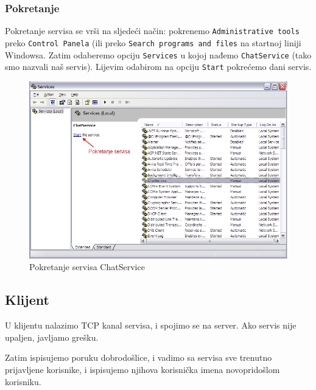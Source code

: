 \documentclass[10pt,a4paper,onecolumn,titlepage]{article}
\begin{document}
\subsubsection{Pokretanje}
Pokretanje servisa se vrši na sljedeći način: pokrenemo \texttt{Administrative tools}
preko \texttt{Control Panela} (ili preko \texttt{Search programs and files} na startnoj liniji Windowsa. Zatim odaberemo opciju \texttt{Services} u kojoj nađemo \texttt{ChatService}
(tako smo nazvali naš servis). Lijevim odabirom na opciju \texttt{Start} pokrećemo
dani servis.
\begin{figure}[!ht]
\begin{minipage}{\textwidth}
\centering
\includegraphics[width=\textwidth]{images/start_service.jpg}
\caption{Pokretanje servisa ChatService}
\end{minipage}
\end{figure}

\subsection{Klijent}

U klijentu nalazimo TCP kanal servisa, i spojimo se na server. Ako servis
nije upaljen, javljamo grešku.

Zatim ispisujemo poruku dobrodošlice, i vadimo sa servisa sve trenutno prijavljene
korisnike, i ispisujemo njihova korisnička imena novopridošlom korisniku. 
\end{document}
